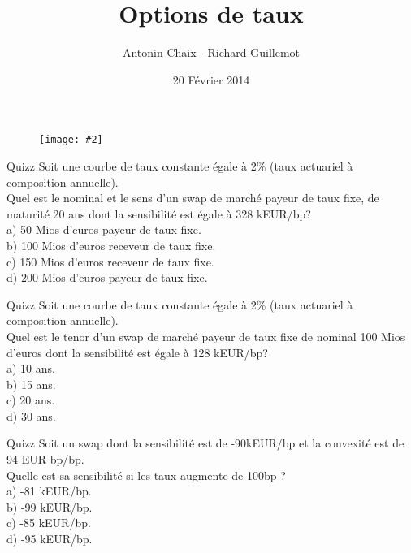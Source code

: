 \documentclass{beamer}
\title[Produits dérivés de taux]{Options de taux}
\author{Antonin Chaix - Richard Guillemot}
\institute{Master IFMA}
\date{20 Février 2014}
\newcommand{\FIG}[2]{\texttt{[image: \#2]}}
\begin{document}
\begin{frame}
\titlepage
\begin{figure}[h]
\centering \FIG{5cm}{figures/UPMC_IFMA.jpg}
\end{figure}

\end{frame}

\begin{frame}{Quizz}
Soit une courbe de taux constante égale à 2\% (taux actuariel à composition annuelle).\\
\vspace{0.5cm}
Quel est le nominal et le sens d'un swap de marché payeur de taux fixe, de maturité 20 ans dont la sensibilité est égale à 328 kEUR/bp?\\
\vspace{0.5cm}
a) 50 Mios d'euros payeur de taux fixe.\\
b) 100 Mios d'euros receveur de taux fixe.\\
c) 150 Mios d'euros receveur de taux fixe.\\
d) 200 Mios d'euros payeur de taux fixe.\\
\end{frame}


\begin{frame}{Quizz}
Soit une courbe de taux constante égale à 2\% (taux actuariel à composition annuelle).\\
\vspace{0.5cm}
Quel est le tenor d'un swap de marché payeur de taux fixe de nominal 100 Mios d'euros dont la sensibilité est égale à 128 kEUR/bp?\\
\vspace{0.5cm}
a) 10 ans.\\
b) 15 ans.\\
c) 20 ans.\\
d) 30 ans.\\
\end{frame}

\begin{frame}{Quizz}
Soit un swap dont la sensibilité est de -90kEUR/bp et la convexité est de 94 EUR bp/bp.\\
\vspace{0.5cm}
Quelle est sa sensibilité si les taux augmente de 100bp ?\\
a) -81 kEUR/bp.\\
b) -99 kEUR/bp.\\
c) -85 kEUR/bp.\\
d) -95 kEUR/bp.\\
\end{frame}
\end{document}

